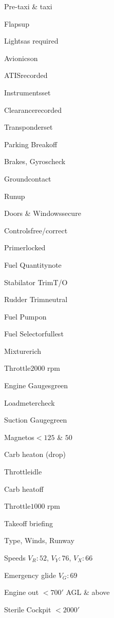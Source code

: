 \begin{multicols}{2}
\begin{checklist}{Pre-taxi \& taxi}
    \item{Flaps}{up}
    \item{Lights}{as required}
    \item{Avionics}{on}
    \item{ATIS}{recorded}
    \item{Instruments}{set}
    \item{Clearance}{recorded}
    \item{Transponder}{set}
    \item{Parking Break}{off}
    \item{Brakes, Gyros}{check}
    \item{Ground}{contact}
\end{checklist}

\begin{checklist}{Runup}
    \item{Doors \& Windows}{secure}
    \item{Controls}{free/correct}
    \item{Primer}{locked}
    \item{Fuel Quantity}{note}
    \item{Stabilator Trim}{T/O}
    \item{Rudder Trim}{neutral}
    \item{Fuel Pump}{on}
    \item{Fuel Selector}{fullest}
    \item{Mixture}{rich}
    \item{Throttle}{$2000$ rpm}
    \item{Engine Gauges}{green}
    \item{Loadmeter}{check}
    \item{Suction Gauge}{green}
    \item{Magnetos}{$<125$ \& $50$}
    \item{Carb heat}{on (drop)}
    \item{Throttle}{idle}
    \item{Carb heat}{off}
    \item{Throttle}{$1000$ rpm}
\end{checklist}

\begin{checklist}{Takeoff briefing}
    \item{Type, Winds, Runway}{}
    \item{Speeds $V_R: 52$, $V_Y: 76$, $V_X: 66$}{}
    \item{Emergency glide $V_G: 69$}{}
    \item{Engine out $<700'$ AGL \& above}{}
    \item{Sterile Cockpit $<2000'$}{}
\end{checklist}


\end{multicols}
